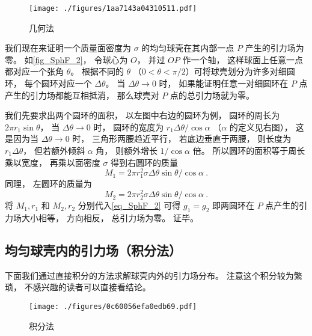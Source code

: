 \begin{figure}[ht]
\centering
\texttt{[image: ./figures/1aa7143a04310511.pdf]}
\caption{几何法} \label{fig_SphF_2}
\end{figure}

我们现在来证明一个质量面密度为 $\sigma$ 的均匀球壳在其内部一点 $P$ 产生的引力场为零。 如\autoref{fig_SphF_2}， 令球心为 $O$， 并过 $OP$ 作一个轴， 这样球面上任意一点都对应一个张角 $\theta$。 根据不同的 $\theta$ （$0 < \theta < \pi/2$）可将球壳划分为许多对细圆环， 每个圆环对应一个 $\Delta\theta$。 当 $\Delta\theta\to 0$ 时， 如果能证明任意一对细圆环在 $P$ 点产生的引力场都能互相抵消， 那么球壳对 $P$ 点的总引力场就为零。

我们先要求出两个圆环的面积， 以左图中右边的圆环为例， 圆环的周长为 $2\pi r_1\sin\theta$， 当 $\Delta\theta\to 0$ 时， 圆环的宽度为 $r_1\Delta\theta/\cos\alpha$ （$\alpha$ 的定义见右图）， 这是因为当 $\Delta \theta \to 0$ 时， 三角形两腰趋近平行， 若底边垂直于两腰， 则长度为 $r_1\Delta\theta$， 但若额外倾斜 $\alpha$ 角， 则额外增长 $1/\cos\alpha$ 倍。 所以圆环的面积等于周长乘以宽度， 再乘以面密度 $\sigma$ 得到右圆环的质量
\begin{equation}
M_1 = 2\pi r_1^2 \sigma \Delta\theta\sin\theta /\cos\alpha~.
\end{equation}
同理， 左圆环的质量为
\begin{equation}
M_2 = 2\pi r_2^2 \sigma \Delta\theta\sin\theta /\cos\alpha~.
\end{equation}
将 $M_1, r_1$ 和 $M_2, r_2$ 分别代入\autoref{eq_SphF_2} 可得 $g_1 = g_2$ 即两圆环在 $P$ 点产生的引力场大小相等， 方向相反， 总引力场为零。 证毕。

\subsection{均匀球壳内的引力场（积分法）}
下面我们通过直接积分的方法求解球壳内外的引力场分布。 注意这个积分较为繁琐， 不感兴趣的读者可以直接看结论。

\begin{figure}[ht]
\centering
\texttt{[image: ./figures/0c60056efa0edb69.pdf]}
\caption{积分法} \label{fig_SphF_3}
\end{figure}

